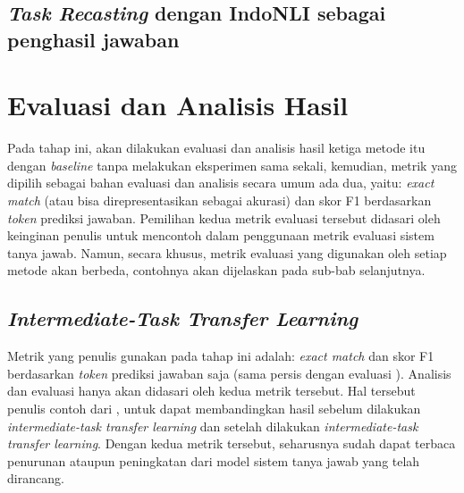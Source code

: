 \subsection{\emph{Task Recasting} dengan IndoNLI sebagai penghasil jawaban}
\todo

\section{Evaluasi dan Analisis Hasil}
Pada tahap ini, akan dilakukan evaluasi dan analisis hasil ketiga metode itu dengan \emph{baseline} tanpa melakukan eksperimen sama sekali, kemudian, metrik yang dipilih sebagai bahan evaluasi dan analisis secara umum ada dua, yaitu: \emph{exact match} (atau bisa direpresentasikan sebagai akurasi) dan skor F1 berdasarkan \emph{token} prediksi jawaban. Pemilihan kedua metrik evaluasi tersebut didasari oleh keinginan penulis untuk mencontoh \citep{rajpurkar-etal-2016-squad} dalam penggunaan metrik evaluasi sistem tanya jawab. Namun, secara khusus, metrik evaluasi yang digunakan oleh setiap metode akan berbeda, contohnya akan dijelaskan pada sub-bab selanjutnya.

\subsection{\emph{Intermediate-Task Transfer Learning}}
Metrik yang penulis gunakan pada tahap ini adalah: \emph{exact match} dan skor F1 berdasarkan \emph{token} prediksi jawaban saja (sama persis dengan evaluasi \citep{rajpurkar-etal-2016-squad}). Analisis dan evaluasi hanya akan didasari oleh kedua metrik tersebut. Hal tersebut penulis contoh dari \citet{rajpurkar-etal-2016-squad}, untuk dapat membandingkan hasil sebelum dilakukan \emph{intermediate-task transfer learning} dan setelah dilakukan \emph{intermediate-task transfer learning}. Dengan kedua metrik tersebut, seharusnya sudah dapat terbaca penurunan ataupun peningkatan dari model sistem tanya jawab yang telah dirancang.

